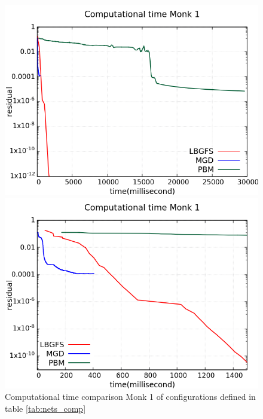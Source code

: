 \begin{figure}[H]
	\centering
	\begin{minipage}[t]{0.5\linewidth}
		\includegraphics[width=\linewidth]{data/Comparison/Monk1/Monk1_CT_Comparison_log_standard.png}
	\end{minipage}%
	\begin{minipage}[t]{0.5\linewidth}
		\includegraphics[width=\linewidth]{data/Comparison/Monk1/Monk1_CT_Comparison_log_zoom.png}
	\end{minipage}
	\caption{Computational time comparison Monk 1 of configurations defined in table \ref{tab:nets_comp}}
	\label{CT-Monk1}
\end{figure}
